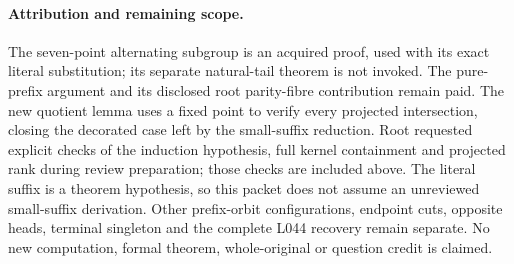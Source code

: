 \documentclass[11pt,a4paper]{article}
\begin{document}
\paragraph{Attribution and remaining scope.}
The seven-point alternating subgroup is an acquired proof, used
with its exact literal substitution; its separate natural-tail
theorem is not invoked. The pure-prefix argument and its disclosed
root parity-fibre contribution remain paid. The new quotient lemma
uses a fixed point to verify every projected intersection, closing
the decorated case left by the small-suffix reduction. Root requested
explicit checks of the induction hypothesis, full kernel containment
and projected rank during review preparation; those checks are
included above. The literal suffix is a theorem hypothesis, so
this packet does not assume an unreviewed small-suffix derivation.
Other prefix-orbit configurations, endpoint cuts, opposite heads,
terminal singleton and the complete L044 recovery remain separate.
No new computation, formal theorem, whole-original or question
credit is claimed.
\end{document}
